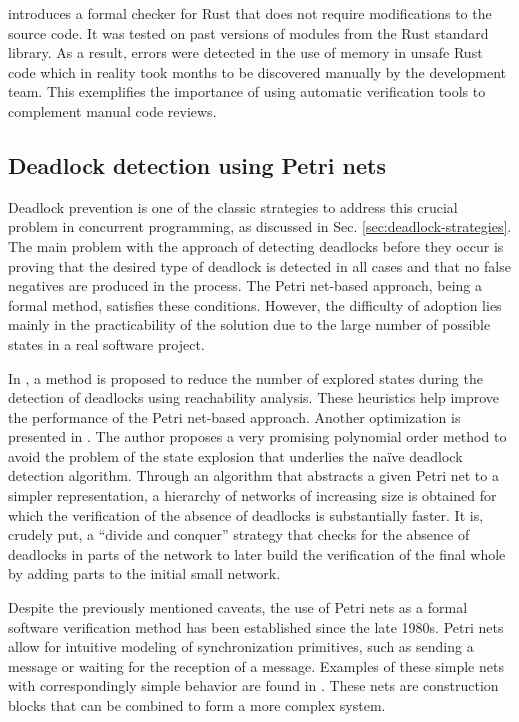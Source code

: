 \documentclass[../Thesis.tex]{subfiles}
\begin{document}
\cite{toman2015crust} introduces a formal checker for Rust
that does not require modifications to the source code.
It was tested on past versions of modules from the Rust standard library.
As a result, errors were detected in the use of memory in unsafe Rust code
which in reality took months to be discovered manually by the development team.
This exemplifies the importance of using automatic verification tools
to complement manual code reviews.

\subsection{Deadlock detection using Petri nets}

Deadlock prevention is one of the classic strategies
to address this crucial problem in concurrent programming,
as discussed in Sec. \ref{sec:deadlock-strategies}.
The main problem with the approach of detecting deadlocks before they occur
is proving that the desired type of deadlock is detected in all cases
and that no false negatives are produced in the process.
The Petri net-based approach, being a formal method, satisfies these conditions.
However, the difficulty of adoption lies mainly in the practicability of the solution
due to the large number of possible states in a real software project.

In \cite{karatkevich2014deadlock}, a method is proposed
to reduce the number of explored states
during the detection of deadlocks using reachability analysis.
These heuristics help improve the performance of the Petri net-based approach.
Another optimization is presented in \cite{kungas2005petri}.
The author proposes a very promising polynomial order method to avoid the problem
of the state explosion that underlies the naïve deadlock detection algorithm.
Through an algorithm that abstracts a given Petri net to a simpler representation,
a hierarchy of networks of increasing size is obtained
for which the verification of the absence of deadlocks is substantially faster.
It is, crudely put, a ``divide and conquer'' strategy
that checks for the absence of deadlocks in parts of the network
to later build the verification of the final whole
by adding parts to the initial small network.

Despite the previously mentioned caveats,
the use of Petri nets as a formal software verification method
has been established since the late 1980s.
Petri nets allow for intuitive modeling of synchronization primitives,
such as sending a message or waiting for the reception of a message.
Examples of these simple nets with correspondingly simple behavior
are found in \cite{heiner1992petri}.
These nets are construction blocks that can be combined to form a more complex system.
\end{document}
